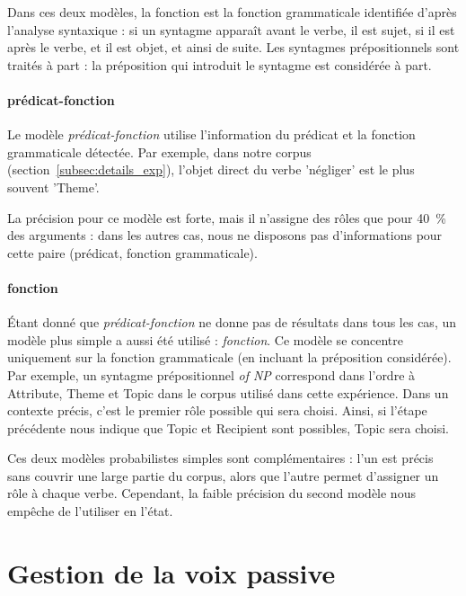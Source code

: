 
Dans ces deux modèles, la fonction est la fonction grammaticale identifiée
d'après l'analyse syntaxique : si un syntagme apparaît avant le verbe, il est
sujet, si il est après le verbe, et il est objet, et ainsi de suite. Les
syntagmes prépositionnels sont traités à part : la préposition qui introduit le
syntagme est considérée à part.

\paragraph{prédicat-fonction}

Le modèle \emph{prédicat-fonction} utilise l'information du prédicat et la
fonction grammaticale détectée. Par exemple, dans notre corpus
(section~\ref{subsec:details_exp}), l'objet direct du verbe 'négliger' est le
plus souvent 'Theme'.

La précision pour ce modèle est forte, mais il n'assigne des rôles que pour
40~\% des arguments : dans les autres cas, nous ne disposons pas d'informations
pour cette paire (prédicat, fonction grammaticale).

\paragraph{fonction}

Étant donné que \emph{prédicat-fonction} ne donne pas de résultats dans tous les
cas, un modèle plus simple a aussi été utilisé : \emph{fonction}. Ce modèle se
concentre uniquement sur la fonction grammaticale (en incluant la préposition
considérée). Par exemple, un syntagme prépositionnel \emph{of NP} correspond
dans l'ordre à Attribute, Theme et Topic dans le corpus utilisé dans cette
expérience. Dans un contexte précis, c'est le premier rôle possible qui sera
choisi. Ainsi, si l'étape précédente nous indique que Topic et Recipient sont
possibles, Topic sera choisi.

Ces deux modèles probabilistes simples sont complémentaires : l'un est précis
sans couvrir une large partie du corpus, alors que l'autre permet d'assigner un
rôle à chaque verbe. Cependant, la faible précision du second modèle nous
empêche de l'utiliser en l'état. %

\section{Gestion de la voix passive}
\label{sec:passif}


